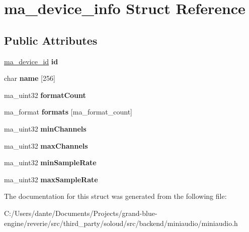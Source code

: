 \hypertarget{structma__device__info}{}\section{ma\+\_\+device\+\_\+info Struct Reference}
\label{structma__device__info}
\subsection*{Public Attributes}
\begin{DoxyCompactItemize}
\item 
\mbox{\label{structma__device__info_a9923a1af37c75b0c79f7eca20485b459}} 
\mbox{\hyperlink{unionma__device__id}{ma\+\_\+device\+\_\+id}} {\bfseries id}
\item 
\mbox{\label{structma__device__info_a9071beeb92c1b1de7be56d73d28e16f7}} 
char {\bfseries name} \mbox{[}256\mbox{]}
\item 
\mbox{\label{structma__device__info_a8a8e05bc318170328820826f936a6c92}} 
ma\+\_\+uint32 {\bfseries format\+Count}
\item 
\mbox{\label{structma__device__info_a1b5bbc7e48caf18af58f58b98d9dcc9d}} 
ma\+\_\+format {\bfseries formats} \mbox{[}ma\+\_\+format\+\_\+count\mbox{]}
\item 
\mbox{\label{structma__device__info_a303d6a7c5e777517b0b54af6fa8eb565}} 
ma\+\_\+uint32 {\bfseries min\+Channels}
\item 
\mbox{\label{structma__device__info_a954b388716ae9bcf8b14054bb6463c98}} 
ma\+\_\+uint32 {\bfseries max\+Channels}
\item 
\mbox{\label{structma__device__info_a7978d968a35b8e97878b54c084b9a7c8}} 
ma\+\_\+uint32 {\bfseries min\+Sample\+Rate}
\item 
\mbox{\label{structma__device__info_ab1044c162d3f9c29e3dda9938196dcb4}} 
ma\+\_\+uint32 {\bfseries max\+Sample\+Rate}
\end{DoxyCompactItemize}


The documentation for this struct was generated from the following file\+:\begin{DoxyCompactItemize}
\item 
C\+:/\+Users/dante/\+Documents/\+Projects/grand-\/blue-\/engine/reverie/src/third\+\_\+party/soloud/src/backend/miniaudio/miniaudio.\+h\end{DoxyCompactItemize}
